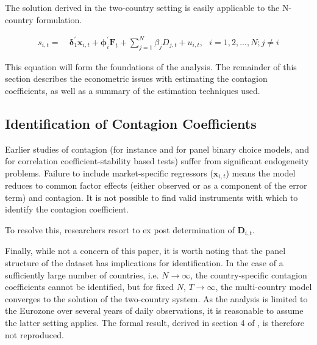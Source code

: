 \documentclass[../base.tex]{subfiles}
\begin{document}
The solution derived in the two-country setting is easily applicable to the N-country formulation. 

\begin{align}
	s_{i,t} =&~\mathbf{\delta}_1^{\prime} \mathbf{x}_{i,t} + \mathbf{\phi}_i^{\prime} \mathbf{F}_t + \sum_{j=1}^{N}\beta_j D_{j,t} + u_{i,t}, ~~~ i = 1,2,...,N ; j \neq i
	\label{eqn:pp_multi}	
\end{align}

This equation will form the foundations of the analysis. The remainder of this section describes the econometric issues with estimating the contagion coefficients, as well as a summary of the estimation techniques used. 

\subsection{Identification of Contagion Coefficients}
\label{ident}

Earlier studies of contagion (for instance \cite{eichengreen1996contagious} and \cite{esquivel1998explaining} for panel binary choice models, \cite{forbes2002no} and \cite{corsetti2005some} for correlation coefficient-stability based tests) suffer from significant endogeneity problems. Failure to include market-specific regressors ($\mathbf{x}_{i, t}$) means the model reduces to common factor effects (either observed or as a component of the error term) and contagion. It is not possible to find valid instruments with which to identify the contagion coefficient. 

To resolve this, researchers resort to ex post determination of $\mathbf{D}_{i,t}$. 







Finally, while not a concern of this paper, it is worth noting that the panel structure of the dataset has implications for identification. In the case of a sufficiently large number of countries, i.e. $N \rightarrow \infty$, the country-specific contagion coefficients cannot be identified, but for fixed $N$, $T \rightarrow \infty$, the multi-country model converges to the solution of the two-country system. As the analysis is limited to the Eurozone over several years of daily observations, it is reasonable to assume the latter setting applies. The formal result, derived in section 4 of \cite{pesaran2007econometric}, is therefore not reproduced.
\end{document}
